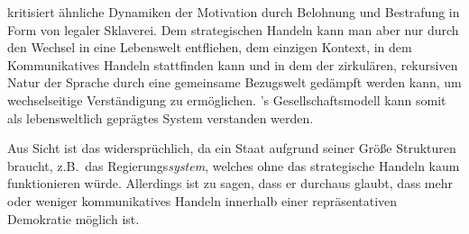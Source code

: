 \citeauthor{Dewey2010} kritisiert ähnliche Dynamiken der Motivation durch Belohnung und Bestrafung in Form von legaler Sklaverei.
Dem strategischen Handeln kann man aber nur durch den Wechsel in eine Lebenswelt entfliehen, dem einzigen Kontext, in dem Kommunikatives Handeln stattfinden kann und in dem der zirkulären, rekursiven Natur der Sprache durch eine gemeinsame Bezugswelt gedämpft werden kann, um wechselseitige Verständigung zu ermöglichen.
\citeauthor{Dewey2010}'s Gesellschaftsmodell kann somit als lebensweltlich geprägtes System verstanden werden.

Aus \citeauthor{Habermas-1998-aa} Sicht ist das widersprüchlich, da ein Staat aufgrund seiner Größe Strukturen braucht, z.B.\ das Regierungs\emph{system}, welches ohne das strategische Handeln kaum funktionieren würde.
Allerdings ist zu sagen, dass er durchaus glaubt, dass mehr oder weniger kommunikatives Handeln innerhalb einer repräsentativen Demokratie möglich ist.


